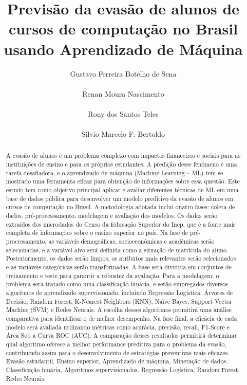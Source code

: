 \documentclass[english, spanish, brazilian]{RBIEarticle} %
\title{Previsão da evasão de alunos de cursos de computação no Brasil usando Aprendizado de Máquina}
\author{%
	\parbox{6cm}{%
		Gustavo Ferreira Botelho de Sena\\
	}
	\parbox{6cm}{%
		Renan Moura Nascimento\\
	}
        \newline
        \parbox{6cm}{%
		Rony dos Santos Teles\\
	}
        \parbox{6cm}{%
		Silvio Marcelo F. Bertoldo\\
	}
}
\begin{document}
\maketitle

\begin{otherlanguage}{brazilian}
\begin{abstract}
A evasão de alunos é um problema complexo com impactos financeiros e sociais para as instituições de ensino e para os próprios estudantes. A predição desse fenômeno é uma tarefa desafiadora, e o aprendizado de máquina (Machine Learning – ML) tem se mostrado uma ferramenta eficaz para obtenção de informações sobre essa questão.
Este estudo tem como objetivo principal aplicar e avaliar diferentes técnicas de ML em uma base de dados pública para desenvolver um modelo preditivo da evasão de alunos em cursos de computação no Brasil. A metodologia adotada inclui quatro fases: coleta de dados, pré-processamento, modelagem e avaliação dos modelos. Os dados serão extraídos dos microdados do Censo da Educação Superior do Inep, que é a fonte mais completa de informações sobre o ensino superior no país.
Na fase de pré-processamento, as variáveis demográficas, socioeconômicas e acadêmicas serão selecionadas, e a variável alvo será definida como a situação de matrícula do aluno. Posteriormente, os dados serão limpos, os atributos mais relevantes serão selecionados e as variáveis categóricas serão transformadas. A base será dividida em conjuntos de treinamento e teste para garantir a robustez da avaliação.
Para a modelagem, o problema será tratado como uma classificação binária, e serão empregados diversos algoritmos de aprendizado supervisionado, incluindo Regressão Logística, Árvores de Decisão, Random Forest, K-Nearest Neighbors (KNN), Naïve Bayes, Support Vector Machine (SVM) e Redes Neurais. A escolha desses algoritmos permitirá uma análise comparativa para identificar o de melhor desempenho.
Na fase final, a eficácia de cada modelo será avaliada utilizando métricas como acurácia, precisão, recall, F1-Score e Área Sob a Curva ROC (AUC). A comparação desses resultados permitirá determinar qual algoritmo oferece a melhor performance preditiva para o problema da evasão, contribuindo assim para o desenvolvimento de estratégias preventivas mais eficazes.
\keywords Evasão estudantil, Ensino superior, Aprendizado de máquina, Mineração de dados, Classificação binária, Algoritmos supervisionados, Regressão Logística, Random Forest, Redes Neurais.
\end{abstract}
\end{otherlanguage}
\end{document}
